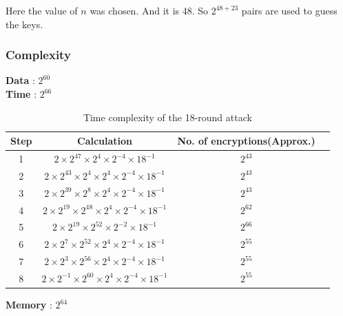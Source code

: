 \documentclass{transcrypto}
\begin{document}
	Here the value of $n$ was chosen. And it is 48. So $ 2^{48+23} $ pairs are used to guess the keys.
	\subsubsection{Complexity}\label{compl}
	\textbf{Data} : $2^{60}$\\
	\textbf{Time} : $2^{66}$\\
	\begin{table}[h]
		\centering
		\begin{tabular}{|c|c|c|c|}
			\hline
			\textbf{Step} & \textbf{Calculation} & \textbf{No. of encryptions}(Approx.) \\ \hline
			1 & $2 \times 2^{47} \times 2^4 \times 2^{-4} \times 18^{-1}$ & $2^{43}$ \\ \hline
			2 & $2 \times 2^{43} \times 2^4 \times 2^{4} \times 2^{-4} \times 18^{-1}$ & $2^{43}$ \\ \hline
			3 & $2 \times 2^{39} \times 2^8 \times 2^{4} \times 2^{-4} \times 18^{-1}$ & $2^{43}$ \\ \hline
			4 & $2 \times 2^{19} \times 2^{48} \times 2^4 \times 2^{-4} \times 18^{-1}$ & $2^{62}$ \\ \hline
			5 & $2 \times 2^{19} \times 2^{52} \times 2^{-2} \times 18^{-1}$ & \textbf{$2^{66}$} \\ \hline
			6 & $2 \times 2^{7} \times 2^{52} \times 2^{4} \times 2^{-4} \times 18^{-1}$ & $2^{55}$ \\ \hline
			7 & $2 \times 2^{3} \times 2^{56} \times 2^{4} \times 2^{-4} \times 18^{-1}$ & $2^{55}$ \\ \hline
			8 & $2 \times 2^{-1} \times 2^{60} \times 2^{4} \times 2^{-4} \times 18^{-1}$ & $2^{55}$ \\ \hline
		\end{tabular}
	\caption{Time complexity of the 18-round attack}
	\end{table}
	\textbf{Memory} : $2^{64}$
	
\end{document}
